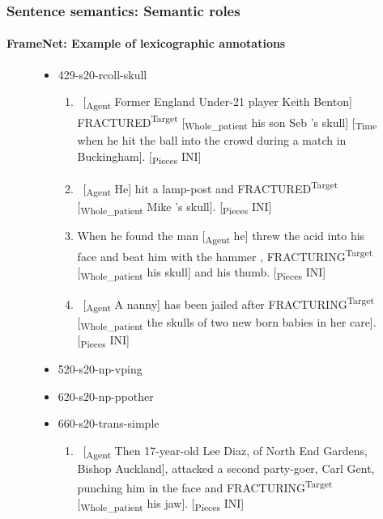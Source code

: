 \documentclass[xcolor=table]{beamer}
\begin{document}
\begin{frame}
	\frametitle{Sentence semantics: Semantic roles}
	\framesubtitle{FrameNet: Example of lexicographic annotations}
	
	\vskip-5pt
	\begin{figure}
		\begin{tcolorbox}[colback=white, colframe=blue, boxrule=1pt, text width=.91\textwidth]
			\tiny\bfseries
			\vspace{-6pt}
		\begin{itemize}
			\item 429-s20-rcoll-skull
			\begin{enumerate}\tiny
				\item \ [\textsubscript{\color{red}Agent} Former England Under-21 player Keith Benton] FRACTURED\textsuperscript{\color{red}Target} [\textsubscript{\color{red}Whole\_patient} his son Seb 's skull] [\textsubscript{\color{red}Time} when he hit the ball into the crowd during a match in Buckingham]. [\textsubscript{\color{red}Pieces} INI] 
				\item \ [\textsubscript{\color{red}Agent} He] hit a lamp-post and FRACTURED\textsuperscript{\color{red}Target} [\textsubscript{\color{red}Whole\_patient} Mike 's skull]. [\textsubscript{\color{red}Pieces} INI] 
				\item When he found the man [\textsubscript{\color{red}Agent} he] threw the acid into his face and beat him with the hammer , FRACTURING\textsuperscript{\color{red}Target} [\textsubscript{\color{red}Whole\_patient} his skull] and his thumb. [\textsubscript{\color{red}Pieces} INI] 
				\item \ [\textsubscript{\color{red}Agent} A nanny] has been jailed after FRACTURING\textsuperscript{\color{red}Target} [\textsubscript{\color{red}Whole\_patient} the skulls of two new born babies in her care]. [\textsubscript{\color{red}Pieces} INI] 
			\end{enumerate}
			\item 520-s20-np-vping
			\item 620-s20-np-ppother
			\item 660-s20-trans-simple
			\begin{enumerate}\tiny
				\item \ [\textsubscript{\color{red}Agent} Then 17-year-old Lee Diaz, of North End Gardens, Bishop Auckland], attacked a second party-goer, Carl Gent, punching him in the face and FRACTURING\textsuperscript{\color{red}Target} [\textsubscript{\color{red}Whole\_patient} his jaw]. [\textsubscript{\color{red}Pieces} INI] 
			\end{enumerate}
			

\end{itemize}
\end{tcolorbox}
\end{figure}
\end{frame}
\end{document}
